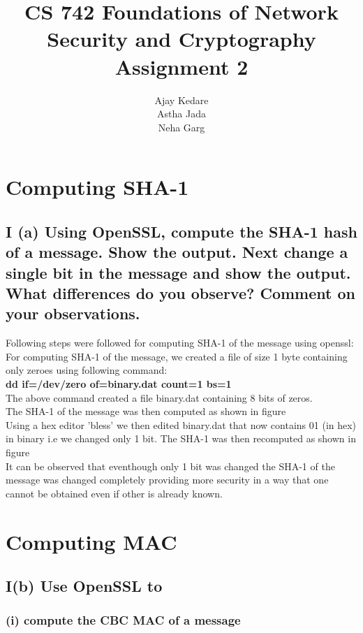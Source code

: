 \documentclass{article}
\title{CS 742 Foundations of Network Security and Cryptography \\ Assignment 2}
\author{ Ajay Kedare   \space \space 153059007\\ Astha Jada \space \space 153050027 \\ Neha Garg \space \space \space  153050039}
\begin{document}
\maketitle
\clearpage

\section{Computing SHA-1}
\subsection{I (a) Using OpenSSL, compute the SHA-1 hash of a message. Show the output.
Next change a single bit in the message and show the output. What differences
do you observe? Comment on your observations.}

Following steps were followed for computing SHA-1 of the message using openssl:\\

	
\noindent For computing SHA-1 of the message, we created a file of size 1 byte containing only zeroes using following command:\\
\textbf{ dd if=/dev/zero of=binary.dat count=1 bs=1}\\

\noindent The above command created a file binary.dat containing 8 bits of zeros.\\

\noindent The SHA-1 of the message was then computed as shown in figure\\

\noindent Using a hex editor 'bless' we then edited binary.dat that now contains 01 (in hex) in binary i.e we changed only 1 bit. The SHA-1 was then recomputed as shown in figure\\

\noindent It can be observed that eventhough only 1 bit was changed the SHA-1 of the message was changed completely providing more security in a way that one cannot be obtained even if other is already known.
 
 


\section{Computing MAC}
\subsection{I(b) Use OpenSSL to}
\subsubsection{(i) compute the CBC MAC of a message} 
\end{document}
